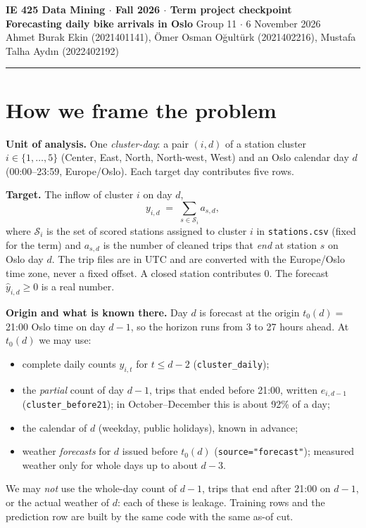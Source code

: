 \documentclass[10pt,a4paper]{article}
\begin{document}
{\large\bfseries IE 425 Data Mining $\cdot$ Fall 2026 $\cdot$ Term project checkpoint}\\[0.3ex]
{\bfseries Forecasting daily bike arrivals in Oslo} \hfill Group 11 $\cdot$ 6 November 2026\\[0.2ex]
{\small Ahmet Burak Ekin (2021401141), Ömer Osman Oğultürk (2021402216), Mustafa Talha Aydın (2022402192)}

\vspace{-0.6ex}\noindent\rule{\linewidth}{0.4pt}

\section{How we frame the problem}

\textbf{Unit of analysis.} One \emph{cluster-day}: a pair $(i,d)$ of a station cluster
$i\in\{1,\dots,5\}$ (Center, East, North, North-west, West) and an Oslo calendar day $d$
(00:00--23:59, Europe/Oslo). Each target day contributes five rows.

\textbf{Target.} The inflow of cluster $i$ on day $d$,
\[
  y_{i,d} \;=\; \sum_{s\in \mathcal{S}_i} a_{s,d},
\]
where $\mathcal{S}_i$ is the set of scored stations assigned to cluster $i$ in
\texttt{stations.csv} (fixed for the term) and $a_{s,d}$ is the number of cleaned trips that
\emph{end} at station $s$ on Oslo day $d$. The trip files are in UTC and are converted with the
Europe/Oslo time zone, never a fixed offset. A closed station contributes $0$. The forecast
$\hat y_{i,d}\ge 0$ is a real number.

\textbf{Origin and what is known there.} Day $d$ is forecast at the origin $t_0(d)=$ 21:00 Oslo
time on day $d-1$, so the horizon runs from 3 to 27 hours ahead. At $t_0(d)$ we may use:
\begin{itemize}
  \item complete daily counts $y_{i,t}$ for $t\le d-2$ (\texttt{cluster\_daily});
  \item the \emph{partial} count of day $d-1$, trips that ended before 21:00, written $e_{i,d-1}$
        (\texttt{cluster\_before21}); in October--December this is about 92\% of a day;
  \item the calendar of $d$ (weekday, public holidays), known in advance;
  \item weather \emph{forecasts} for $d$ issued before $t_0(d)$ (\texttt{source="forecast"});
        measured weather only for whole days up to about $d-3$.
\end{itemize}
We may \emph{not} use the whole-day count of $d-1$, trips that end after 21:00 on $d-1$, or the
actual weather of $d$: each of these is leakage. Training rows and the prediction row are built by
the same code with the same as-of cut.
\end{document}
